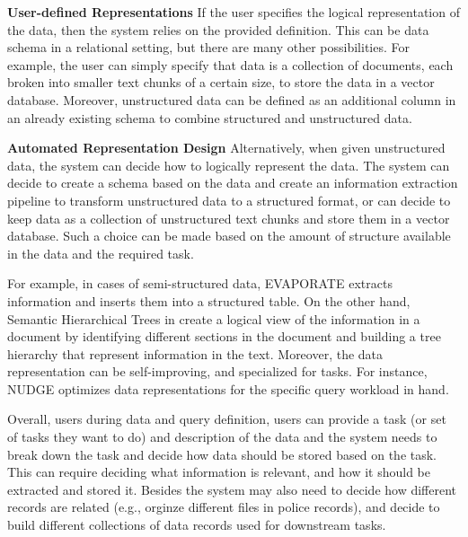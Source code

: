 \textbf{User-defined Representations}
If the user specifies the logical representation of the data, then the system relies on the provided definition. This can be data schema in a relational setting, but there are many other possibilities. For example, the user can simply specify that data is a collection of documents, each broken into smaller text chunks of a certain size, to store the data in a vector database. Moreover, unstructured data can be defined as an additional column in an already existing schema to combine structured and unstructured data. 

\textbf{Automated Representation Design}
Alternatively, when given unstructured data, the system can decide how to logically represent the data. The system can decide to create a schema based on the data and create an information extraction pipeline to transform unstructured data to a structured format, or can decide to keep data as a collection of unstructured text chunks and store them in a vector database. Such a choice can be made based on the amount of structure available in the data and the required task.

For example, in cases of semi-structured data, EVAPORATE \cite{arora2023language} extracts information and inserts them into a structured table. On the other hand, Semantic Hierarchical Trees in \cite{lin2024towards} create a logical view of the information in a document by identifying different sections in the document and building a tree hierarchy that represent information in the text. Moreover, the data representation can be self-improving, and specialized for tasks. For instance, NUDGE \cite{zeighami2024nudge} optimizes data representations for the specific query workload in hand. 

Overall, users during data and query definition, users can provide a task (or set of tasks they want to do) and description of the data and the system needs to break down the task and decide how data should be stored based on the task. This can require deciding what information is relevant, and how it should be extracted and stored it. Besides the system may also need to decide how different records are related (e.g., orginze different files in police records), and decide to build different collections of data records used for downstream tasks.


